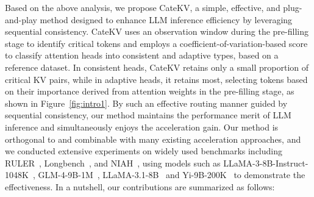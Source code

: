 Based on the above analysis, we propose CateKV, a simple, effective, and plug-and-play method designed to enhance LLM inference efficiency by leveraging sequential consistency. CateKV uses an observation window during the pre-filling stage to identify critical tokens and employs a coefficient-of-variation-based score to classify attention heads into consistent and adaptive types, based on a reference dataset. In consistent heads, CateKV retains only a small proportion of critical KV pairs, while in adaptive heads, it retains most, selecting tokens based on their importance derived from attention weights in the pre-filling stage, as shown in Figure~\ref{fig:intro1}. 
By such an effective routing manner guided by sequential consistency, our method maintains the performance merit of LLM inference and simultaneously enjoys the acceleration gain.
Our method is orthogonal to and combinable with many existing acceleration approaches, and we conducted extensive experiments on widely used benchmarks including RULER~\cite{ruler}, Longbench~\cite{longbench}, and NIAH~\cite{niah}, using models such as LLaMA-3-8B-Instruct-1048K~\cite{llama3-8b}, GLM-4-9B-1M~\cite{glm}, LLaMA-3.1-8B~\cite{llama3-1} and Yi-9B-200K~\cite{yi} to demonstrate the effectiveness. 
In a nutshell, our contributions are summarized as follows:
